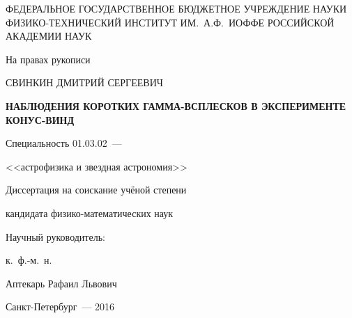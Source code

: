 \thispagestyle{empty}

\begin{center}
{\small
ФЕДЕРАЛЬНОЕ ГОСУДАРСТВЕННОЕ БЮДЖЕТНОЕ УЧРЕЖДЕНИЕ НАУКИ\\
ФИЗИКО-ТЕХНИЧЕСКИЙ ИНСТИТУТ ИМ.~А.Ф.~ИОФФЕ РОССИЙСКОЙ АКАДЕМИИ НАУК\\
}
\end{center}

\vspace{20mm}
\begin{flushright}
На правах рукописи

\end{flushright}

\vspace{20mm}
\begin{center}
{\large СВИНКИН ДМИТРИЙ СЕРГЕЕВИЧ}
\end{center}

\vspace{5mm}
\begin{center}
{\bf \large НАБЛЮДЕНИЯ КОРОТКИХ ГАММА-ВСПЛЕСКОВ В ЭКСПЕРИМЕНТЕ КОНУС-ВИНД
\par}

\vspace{10mm}
{%
Специальность 01.03.02~---

<<астрофизика и звездная астрономия>>
}

\vspace{10mm}
Диссертация на соискание учёной степени

кандидата физико-математических наук
\end{center}

\vspace{10mm}
\begin{flushright}
Научный руководитель:

к.~ф.-м.~н.

Аптекарь Рафаил Львович
\end{flushright}

\vspace{20mm}
\begin{center}
{Санкт-Петербург~--- 2016}
\end{center}

\newpage